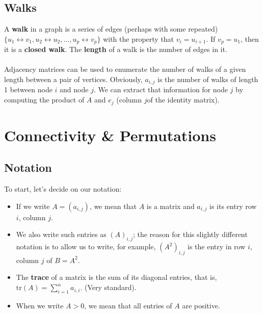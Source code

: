 \documentclass[a4paper,11pt]{article}
\begin{document}
\subsection{Walks}
A \textbf{walk} in a graph is a series of edges (perhaps with some repeated) $\{ u_1 \leftrightarrow v_1, u_2 \leftrightarrow u_2, \dots, u_p \leftrightarrow v_p\}$ with the property that $v_i = u_{i+1}$.
If $v_p = u_1$, then it is a \textbf{closed walk}.
The \textbf{length} of a walk is the number of edges in it.
\\\\
Adjacency matrices can be used to enumerate the number of walks of a given length between a pair of vertices.
Obviously, $a_{i,j}$ is the number of walks of length 1 between node $i$ and node $j$.
We can extract that information for node $j$ by computing the product of $A$ and $e_j$ (column $j$of the identity matrix).

\section{Connectivity \& Permutations}
\subsection{Notation}
To start, let's decide on our notation:
\begin{itemize}
    \item   If we write $A = (a_{i,j})$, we mean that $A$ is a matrix and $a_{i,j}$ is its entry row $i$, column $j$.
    \item   We also write such entries as $(A)_{i,j}$;
            the reason for this slightly different notation is to allow us to write, for example, $(A^2)_{i,j}$ is the entry in row $i$, column $j$ of $B = A^2$.
    \item   The \textbf{trace} of a matrix is the sum of its diagonal entries, that is, $\text{tr}(A) = \sum^n_{i=1}a_{i,i}$. (Very standard).
    \item   When we write $A > 0$, we mean that all entries of $A$ are positive.
\end{itemize}
\end{document}
